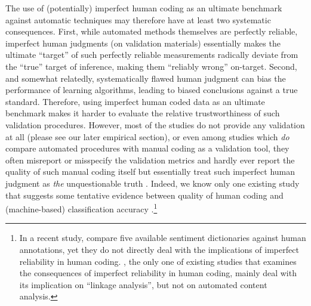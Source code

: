 \documentclass[man, 12pt, a4paper, nolmodern, noextraspace]{apa6}
\begin{document}
    The use of (potentially) imperfect human coding as an ultimate benchmark against automatic techniques may therefore have at least two systematic consequences. First, while automated methods themselves are perfectly reliable, imperfect human judgments (on validation materials) essentially makes the ultimate \enquote{target} of such perfectly reliable measurements radically deviate from the \enquote{true} target of inference, making them \enquote{reliably wrong} on-target. Second, and somewhat relatedly, systematically flawed human judgment can bias the performance of learning algorithms, leading to biased conclusions against a true standard. Therefore, using imperfect human coded data as an ultimate benchmark makes it harder to evaluate the relative trustworthiness of such validation procedures. However, most of the studies do not provide any validation at all (please see our later empirical section), or even among studies which \textit{do} compare automated procedures with manual coding as a validation tool, they often misreport or misspecify the validation metrics and hardly ever report the quality of such manual coding itself but essentially treat such imperfect human judgment as \textit{the} unquestionable truth \parencites[e.g.,][]{gonzalez2015signals, lowe2013validating, YoungSoroka2012}. Indeed, we know only one existing study that suggests some tentative evidence between quality of human coding and (machine-based) classification accuracy \parencite{burscher2014teaching}.\footnote{In a recent study, \textcite{gonzalez2015signals} compare five available sentiment dictionaries against human annotations, yet they do not directly deal with the implications of imperfect reliability in human coding. \textcite{scharkow2017measurement}, the only one of existing studies that examines the consequences of imperfect reliability in human coding, mainly deal with its implication on \enquote{linkage analysis}, but not on automated content analysis.}     
   
\end{document}
